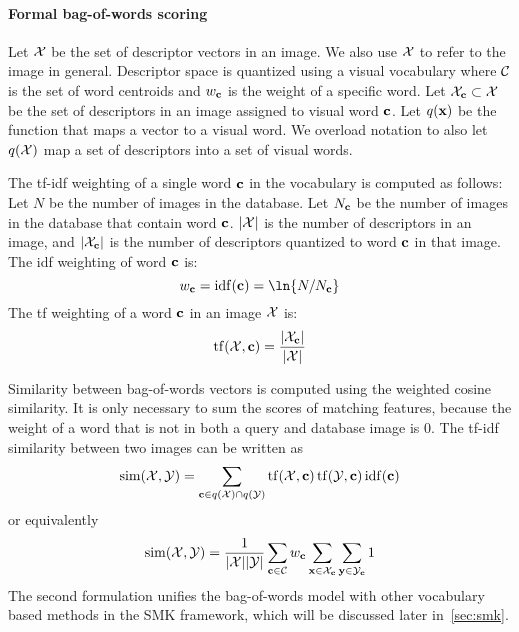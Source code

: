         \paragraph{Formal bag-of-words scoring}
            Let $\mathcal{X}$ be the set of descriptor vectors in an image. We also use $\mathcal{X}$ to refer to the image in
            general. Descriptor space is quantized using a visual vocabulary where $\mathcal{C}$ is the set of word
            centroids and $w_{\mathbf{c}}$ is the weight of a specific word. Let $\mathcal{X}_{\mathbf{c}} \subset \mathcal{X}$ be the set of descriptors
            in an image assigned to visual word $\mathbf{c}$. Let $q(\mathbf{x})$ be the function that maps a vector to a visual
            word. We overload notation to also let $q(\mathcal{X})$ map a set of descriptors into a set of visual words.

            The tf-idf weighting of a single word $\mathbf{c}$ in the vocabulary is computed as follows: Let $N$ be the
            number of images in the database. Let $N_{\mathbf{c}}$ be the number of images in the database that contain word
            $\mathbf{c}$. $|\mathcal{X}|$ is the number of descriptors in an image, and $|\mathcal{X}_{\mathbf{c}}|$ is the number of
            descriptors quantized to word $\mathbf{c}$ in that image. The idf weighting of word $\mathbf{c}$ is:
            \begin{equation}
                w_\c = \opname{idf}(\c) = \ln{N/N_\c}
            \end{equation}
            The tf weighting of a word $\mathbf{c}$ in an image $\mathcal{X}$ is:
            \begin{equation}
                \operatorname{tf}(\mathcal{X}, \mathbf{c}) = \frac{|\mathcal{X}_{\mathbf{c}}|}{|\mathcal{X}|}
            \end{equation}

            Similarity between bag-of-words vectors is computed using the weighted cosine similarity. It is only
            necessary to sum the scores of matching features, because the weight of a word that is not in both a
            query and database image is $0$. The tf-idf similarity between two images can be written as
            \begin{equation}
                \operatorname{sim}(\mathcal{X}, \mathcal{Y}) = \sum_{\mathbf{c} \in q(\mathcal{X}) \cap q(\mathcal{Y})} \operatorname{tf}(\mathcal{X}, \mathbf{c}) \operatorname{tf}(\mathcal{Y}, \mathbf{c}) \operatorname{idf}(\mathbf{c}) 
            \end{equation}
            or equivalently
            \begin{equation}
                \operatorname{sim}(\mathcal{X}, \mathcal{Y}) = \frac{1}{|\mathcal{X}||\mathcal{Y}|}\sum_{\mathbf{c} \in \mathcal{C}} w_{\mathbf{c}} \sum_{\mathbf{x} \in \mathcal{X}_{\mathbf{c}}} \sum_{\mathbf{y} \in \mathcal{Y}_{\mathbf{c}}} 1
            \end{equation}
            The second formulation unifies the bag-of-words model with other vocabulary based methods in the SMK
            framework, which will be discussed later in~\cref{sec:smk}.

